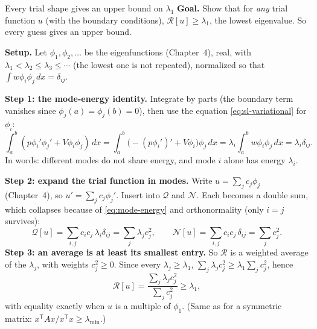\documentclass[11pt]{beamer}
\newcommand{\dd}{\,d}
\newcommand{\Q}{\mathcal Q}
\newcommand{\N}{\mathcal N}
\newcommand{\R}{\mathcal R}
\begin{document}
\begin{frame}[allowframebreaks=1.00]{Every trial shape gives an upper bound on $\lambda_1$}
\small
\textbf{Goal.} Show that for \emph{any} trial function \(u\) (with the boundary conditions),
\(\R[u]\ge\lambda_1\), the lowest eigenvalue. So every guess gives an upper bound.

\textbf{Setup.} Let \(\phi_1,\phi_2,\dots\) be the eigenfunctions (Chapter~4), real, with
\(\lambda_1<\lambda_2\le\lambda_3\le\cdots\) (the lowest one is not repeated), normalized so that \(\int w\phi_i\phi_j\dd x=\delta_{ij}\).

\textbf{Step 1: the mode-energy identity.} Integrate by parts (the boundary term vanishes since
\(\phi_j(a)=\phi_j(b)=0\)), then use the equation \eqref{eq:sl-variational} for \(\phi_i\):
\begin{equation}
 \int_a^b(p\phi_i'\phi_j'+V\phi_i\phi_j)\dd x
 =\int_a^b\bigl(-(p\phi_i')'+V\phi_i\bigr)\phi_j\dd x
 =\lambda_i\!\int_a^b\!w\phi_i\phi_j\dd x=\lambda_i\delta_{ij}.\label{eq:mode-energy}
\end{equation}
In words: different modes do not share energy, and mode \(i\) alone has energy \(\lambda_i\).
\par\framebreak\par
\textbf{Step 2: expand the trial function in modes.} Write \(u=\sum_jc_j\phi_j\) (Chapter~4), so
\(u'=\sum_jc_j\phi_j'\). Insert into \(\Q\) and \(\N\). Each becomes a double sum, which collapses because of
\eqref{eq:mode-energy} and orthonormality (only \(i=j\) survives):
\[
 \Q[u]=\sum_{i,j}c_ic_j\,\lambda_i\delta_{ij}=\sum_j\lambda_jc_j^2,
 \qquad
 \N[u]=\sum_{i,j}c_ic_j\,\delta_{ij}=\sum_jc_j^2.
\]
\textbf{Step 3: an average is at least its smallest entry.} So \(\R\) is a weighted average of the
\(\lambda_j\), with weights \(c_j^2\ge0\). Since every \(\lambda_j\ge\lambda_1\),
\(\sum_j\lambda_jc_j^2\ge\lambda_1\sum_jc_j^2\), hence
\begin{equation}
 \R[u]=\frac{\sum_j\lambda_jc_j^2}{\sum_jc_j^2}\ge\lambda_1 ,
 \label{eq:rayleigh-bound}
\end{equation}
with equality exactly when \(u\) is a multiple of \(\phi_1\). (Same as for a symmetric matrix:
\(x^{\mathsf T}Ax/x^{\mathsf T}x\ge\lambda_{\min}\).)
\end{frame}
\end{document}
